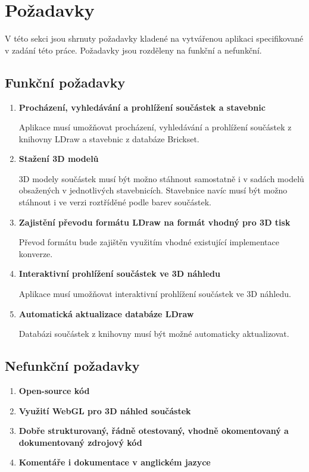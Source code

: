\section{Požadavky}
V této sekci jsou shrnuty požadavky kladené na vytvářenou aplikaci specifikované v zadání této práce. Požadavky jsou rozděleny na funkční a nefunkční.

\subsection{Funkční požadavky}

\begin{enumerate}[label=FP-\arabic*]
    \item \label{fp:model:search} \textbf{Procházení, vyhledávání a prohlížení součástek a stavebnic}

    Aplikace musí umožňovat procházení, vyhledávání a prohlížení součástek z knihovny LDraw a stavebnic z databáze Brickset. 

    \item \label{fp:model:download} \textbf{Stažení 3D modelů}

    3D modely součástek musí být možno stáhnout samostatně i v sadách modelů obsažených v jednotlivých stavebnicích. Stavebnice navíc musí být možno stáhnout i ve verzi roztříděné podle barev součástek.

    \item \label{fp:model:prevod} \textbf{Zajistění převodu formátu LDraw na formát vhodný pro 3D tisk}

    Převod formátu bude zajištěn využitím vhodné existující implementace konverze. 

    \item \label{fp:model:3Dview} \textbf{Interaktivní prohlížení součástek ve 3D náhledu}

    Aplikace musí umožňovat interaktivní prohlížení součástek ve 3D náhledu.

    \item \label{fp:model:update} \textbf{Automatická aktualizace databáze LDraw}

    Databázi součástek z knihovny musí být možné automaticky aktualizovat.

\end{enumerate}

\subsection{Nefunkční požadavky}

\begin{enumerate}[label=NP-\arabic*,resume]
    \item \label{np:opensource} \textbf{Open-source kód}
    \item \label{np:webgl} \textbf{Využití WebGL pro 3D náhled součástek}
    \item \label{np:structure} \textbf{Dobře strukturovaný, řádně otestovaný, vhodně okomentovaný a dokumentovaný zdrojový kód}
    \item \label{np:english} \textbf{Komentáře i dokumentace v anglickém jazyce}
\end{enumerate}